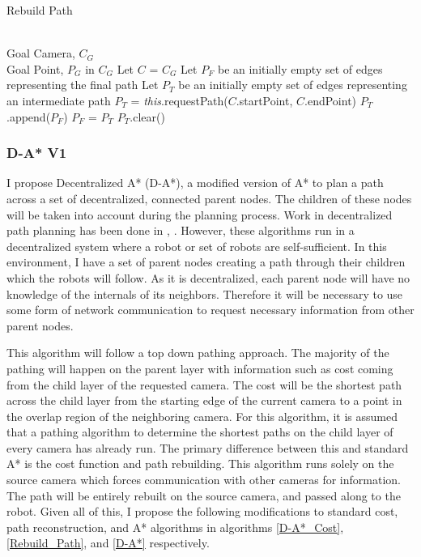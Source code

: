 \begin{algorithm}[h]
\caption{Rebuild Path}
\label{Rebuild_Path}
\begin{algorithmic}[1]
\REQUIRE \ \\
Goal Camera, $C_G$ \\
Goal Point, $P_G$ in $C_G$ 
\STATE Let $C$ = $C_G$
\STATE Let $P_F$ be an initially empty set of edges representing the final path
\STATE Let $P_T$ be an initially empty set of edges representing an intermediate path
	\STATE $P_T$ = \textit{this}.requestPath($C$.startPoint, $C$.endPoint)
	\STATE $P_T$.append($P_F$)
	\STATE $P_F$ = $P_T$
	\STATE $P_T$.clear()
\ENDWHILE
\end{algorithmic}
\end{algorithm}
\subsubsection{D-A* V1}
I propose Decentralized A* (D-A*), a modified version of A* to plan a path across a set of decentralized, connected parent nodes. The children of these nodes will be taken into account during the planning process. Work in decentralized path planning has been done in \cite{DecentralizedPlanningVelagapudi}, \cite{DeadlockDraganjac}. However, these algorithms run in a decentralized system where a robot or set of robots are self-sufficient. In this environment, I have a set of parent nodes creating a path through their children which the robots will follow. As it is decentralized, each parent node will have no knowledge of the internals of its neighbors. Therefore it will be necessary to use some form of network communication to request necessary information from other parent nodes.

This algorithm will follow a top down pathing approach. The majority of the pathing will happen on the parent layer with information such as cost coming from the child layer of the requested camera. The cost will be the shortest path across the child layer from the starting edge of the current camera to a point in the overlap region of the neighboring camera. For this algorithm, it is assumed that a pathing algorithm to determine the shortest paths on the child layer of every camera has already run. The primary difference between this and standard A* is the cost function and path rebuilding. This algorithm runs solely on the source camera which forces communication with other cameras for information. The path will be entirely rebuilt on the source camera, and passed along to the robot. Given all of this, I propose the following modifications to standard cost, path reconstruction, and A* algorithms in algorithms \ref{D-A*_Cost}, \ref{Rebuild_Path}, and \ref{D-A*} respectively. 

